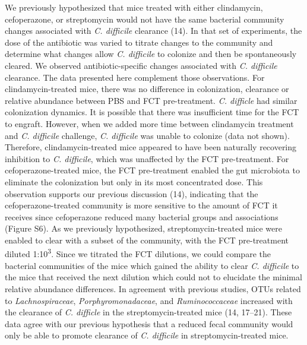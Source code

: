 \documentclass[
  12pt,
]{article}
\begin{document}
We previously hypothesized that mice treated with either clindamycin,
cefoperazone, or streptomycin would not have the same bacterial
community changes associated with \emph{C. difficile} clearance (14). In
that set of experiments, the dose of the antibiotic was varied to
titrate changes to the community and determine what changes allow
\emph{C. difficile} to colonize and then be spontaneously cleared. We
observed antibiotic-specific changes associated with \emph{C. difficile}
clearance. The data presented here complement those observations. For
clindamycin-treated mice, there was no difference in colonization,
clearance or relative abundance between PBS and FCT pre-treatment.
\emph{C. difficle} had similar colonization dynamics. It is possible
that there was insufficient time for the FCT to engraft. However, when
we added more time between clindamycin treatment and \emph{C. difficile}
challenge, \emph{C. difficile} was unable to colonize (data not shown).
Therefore, clindamycin-treated mice appeared to have been naturally
recovering inhibition to \emph{C. difficile}, which was unaffected by
the FCT pre-treatment. For cefoperazone-treated mice, the FCT
pre-treatment enabled the gut microbiota to eliminate the colonization
but only in its most concentrated dose. This observation supports our
previous discussion (14), indicating that the cefoperazone-treated
community is more sensitive to the amount of FCT it receives since
cefoperazone reduced many bacterial groups and associations (Figure S6).
As we previously hypothesized, streptomycin-treated mice were enabled to
clear with a subset of the community, with the FCT pre-treatment diluted
1:10\textsuperscript{3}. Since we titrated the FCT dilutions, we could
compare the bacterial communities of the mice which gained the ability
to clear \emph{C. difficile} to the mice that received the next dilution
which could not to elucidate the minimal relative abundance differences.
In agreement with previous studies, OTUs related to
\emph{Lachnospiraceae}, \emph{Porphyromonadaceae}, and
\emph{Ruminococcaceae} increased with the clearance of \emph{C.
difficle} in the streptomycin-treated mice (14, 17--21). These data
agree with our previous hypothesis that a reduced fecal community would
only be able to promote clearance of \emph{C. difficile} in
streptomycin-treated mice.
\end{document}
